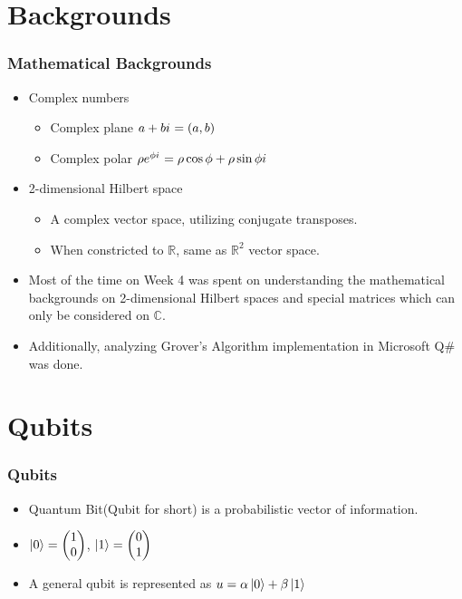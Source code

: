 \documentclass{beamer}
\begin{document}
    \section{Backgrounds}

    \begin{frame}
        \frametitle{Mathematical Backgrounds}
        \begin{itemize}
            \item Complex numbers
            \begin{itemize}
                \item Complex plane $a+b{i\mkern1mu}=(a,b)$
                \item Complex polar $\rho e^{\phi {i\mkern1mu}}=\rho \cos \phi + \rho \sin \phi {i\mkern1mu}$
            \end{itemize}
            \item 2-dimensional Hilbert space
            \begin{itemize}
                \item A complex vector space, utilizing conjugate transposes.
                \item When constricted to $\mathbb{R}$, same as $\mathbb{R}^2$ vector space.
            \end{itemize}
            \item Most of the time on Week 4 was spent on understanding the mathematical backgrounds on 2-dimensional Hilbert spaces and special matrices which can only be considered on $\mathbb{C}$.
            \item Additionally, analyzing Grover's Algorithm implementation in Microsoft Q\# was done.
        \end{itemize}
    \end{frame}

    \section{Qubits}
    \begin{frame}
        \frametitle{Qubits}
        \begin{itemize}
            \item Quantum Bit(Qubit for short) is a probabilistic vector of information.
            \item $\ket{0}=\begin{pmatrix} 1 \\ 0 \end{pmatrix}$, $\ket{1}=\begin{pmatrix} 0 \\ 1 \end{pmatrix}$
            \item A general qubit is represented as $u=\alpha \ket{0}+\beta \ket{1}$
        \end{itemize}
    \end{frame}
\end{document}
